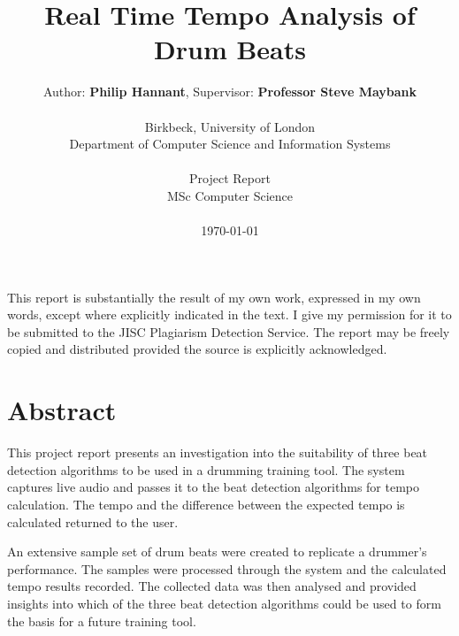 \documentclass[a4paper, 11pt]{article}
\date{}
\begin{document}
 

\LARGE\title{Real Time Tempo Analysis of Drum Beats}

\LARGE\author{Author: \textbf{Philip Hannant}, Supervisor: \textbf{Professor Steve Maybank}\\
\\Birkbeck, University of London\\
Department of Computer Science and Information Systems\\
\\Project Report\\
MSc Computer Science\\
\\\monthyeardate\today\\
\vspace{60mm}
}

\normalsize
\maketitle
\section*{}
\begin{justify}
This report is substantially the result of my own work, expressed in my own words, except where explicitly indicated in the text. I give my permission for it to be submitted to the JISC Plagiarism Detection Service. The report may be freely copied and distributed provided the source is explicitly acknowledged.
\end{justify}


\clearpage
\maketitle
\section*{Abstract}
This project report presents an investigation into the suitability of three beat detection algorithms to be used in a drumming training tool. The system captures live audio and passes it to the beat detection algorithms for tempo calculation. The tempo and the difference between the expected tempo is calculated returned to the user.\par

An extensive sample set of drum beats were created to replicate a drummer's performance. The samples were processed through the system and the calculated tempo results recorded. The collected data was then analysed and provided insights into which of the three beat detection algorithms could be used to form the basis for a future training tool. 
\end{document}
